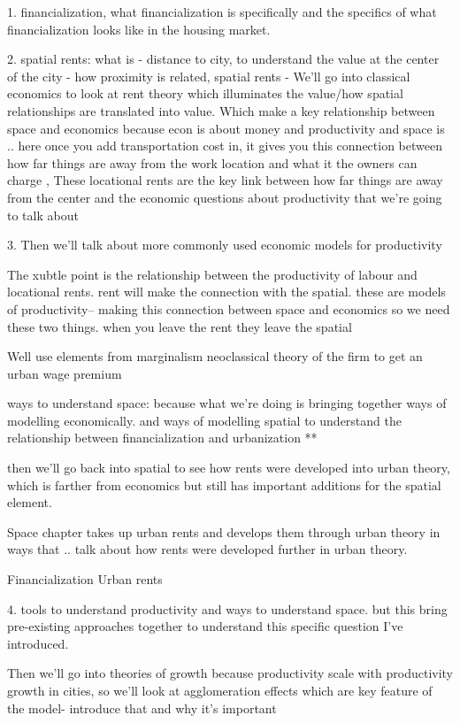 1. financialization, what financialization is  specifically  and  the specifics of what financialization looks like in the housing market.

2. spatial rents: what is - distance to city, to understand the value at the center of the city - how proximity is related, spatial rents - We'll go into classical economics to look at rent theory which illuminates the value/how spatial relationships are translated into value. Which make a key relationship between space and economics because econ is about money and productivity and space is .. here once you add transportation cost in, it gives you this connection between how far things are away from the work location and what it the owners can charge , These locational rents are the key link between how far things are away from the center and the economic questions about productivity  that we're going to talk about

3. Then we'll talk about more commonly used economic models for productivity

The xubtle point is the relationship between the productivity of labour and locational rents.
rent will make the connection with the spatial. 
these are models of productivity-- making this connection between space and economics so we need these two things.
when you leave the rent they leave the spatial

Well use elements from marginalism neoclassical theory of the firm to get an urban wage premium

 ways to understand space: because what we’re doing is bringing together ways of modelling economically. and ways of modelling spatial to understand the relationship between financialization and urbanization **
 
then we'll go back into spatial to see how rents were developed into urban theory, which is farther from economics but still has important additions for the spatial element. 

Space chapter takes up urban rents and develops them through urban theory in ways that .. talk about how rents were developed further in urban theory.

Financialization
Urban rents

4. tools to understand productivity and ways to understand space. but this bring pre-existing approaches together to understand this specific question I've introduced.


Then we'll go into theories of growth because productivity scale with productivity growth in cities, so we'll look at agglomeration effects which are key feature of the model- introduce that and why it's important

